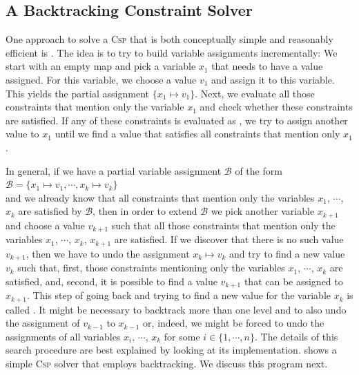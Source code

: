 \subsection{A Backtracking Constraint Solver}
One approach to solve a \textsc{Csp} that is both conceptually simple and reasonably efficient is
.  The idea is to try to build variable assignments incrementally:  We start with
an empty map and pick a variable $x_1$ that needs to have a value assigned.  For this variable, we
choose a value $v_1$ and assign it to this variable.  This yields the partial assignment $\{ x_1 \mapsto v_1 \}$.
Next, we evaluate all those constraints that mention only the variable $x_1$ and check whether these constraints
are satisfied.  If any of these constraints is evaluated as , we try to assign another value to
$x_1$ until we find a value that satisfies all constraints that mention only $x_1$.

In general, if we have a partial variable assignment $\mathcal{B}$ of the form
\\[0.2cm]
\hspace*{1.3cm}
$\mathcal{B} = \{ x_1 \mapsto v_1, \cdots, x_k \mapsto v_k \}$
\\[0.2cm]
and we already know that all constraints that mention only the variables $x_1$, $\cdots$, $x_k$ are satisfied
by $\mathcal{B}$, then in order to extend $\mathcal{B}$ we pick another variable $x_{k+1}$ and choose a
value $v_{k+1}$ such that all those constraints that mention only the variables  $x_1$, $\cdots$, $x_k$,
$x_{k+1}$ are satisfied.  If we discover that there is no such value $v_{k+1}$, then we have to undo the
assignment $x_k \mapsto v_k$ and try to find a new value $v_k$ such that, first, those constraints mentioning only 
the variables  $x_1$, $\cdots$, $x_k$ are satisfied, and, second, it is possible to find a value $v_{k+1}$ that
can be assigned to $x_{k+1}$.  This step of going back and trying to find a new value for the variable $x_k$ is
called .  It might be necessary to backtrack more than one level and to also undo the
assignment of $v_{k-1}$ to $x_{k-1}$ or, indeed, we might be forced to undo the assignments of all variables
$x_i$, $\cdots$, $x_k$ for some $i \in \{1,\cdots, n\}$.  The details of this search procedure are best
explained by looking at its implementation.  shows a simple
\textsc{Csp} solver that employs backtracking.  We discuss this program next.

